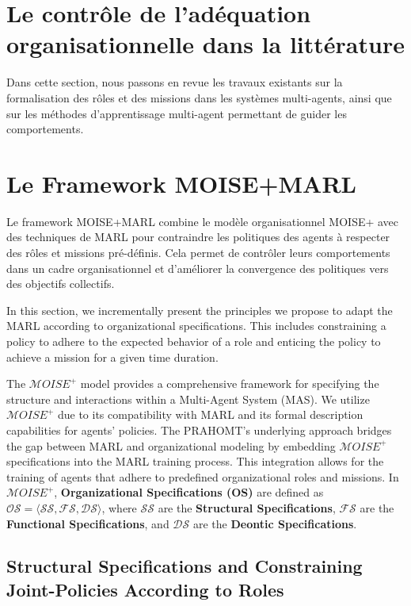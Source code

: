 \documentclass[sigconf,anonymous]{aamas}
\begin{document}
\section{Le contrôle de l'adéquation organisationnelle dans la littérature}
\label{sec:control_problem}

Dans cette section, nous passons en revue les travaux existants sur la formalisation des rôles et des missions dans les systèmes multi-agents, ainsi que sur les méthodes d'apprentissage multi-agent permettant de guider les comportements.

\section{Le Framework MOISE+MARL}
\label{sec:moise_marl_framework}

Le framework MOISE+MARL combine le modèle organisationnel MOISE+ avec des techniques de MARL pour contraindre les politiques des agents à respecter des rôles et missions pré-définis. Cela permet de contrôler leurs comportements dans un cadre organisationnel et d'améliorer la convergence des politiques vers des objectifs collectifs.

In this section, we incrementally present the principles we propose to adapt the MARL according to organizational specifications. This includes constraining a policy to adhere to the expected behavior of a role and enticing the policy to achieve a mission for a given time duration.


The $\mathcal{M}OISE^+$ model provides a comprehensive framework for specifying the structure and interactions within a Multi-Agent System (MAS). We utilize $\mathcal{M}OISE^+$ due to its compatibility with MARL and its formal description capabilities for agents' policies. The PRAHOMT's underlying approach bridges the gap between MARL and organizational modeling by embedding $\mathcal{M}OISE^+$ specifications into the MARL training process. This integration allows for the training of agents that adhere to predefined organizational roles and missions.
%
In $\mathcal{M}OISE^+$, \textbf{Organizational Specifications (OS)} are defined as $\mathcal{OS} = \langle \mathcal{SS}, \mathcal{FS}, \mathcal{DS} \rangle$, where $\mathcal{SS}$ are the \textbf{Structural Specifications}, $\mathcal{FS}$ are the \textbf{Functional Specifications}, and $\mathcal{DS}$ are the \textbf{Deontic Specifications}.

\subsection{Structural Specifications and Constraining Joint-Policies According to Roles}
\end{document}
